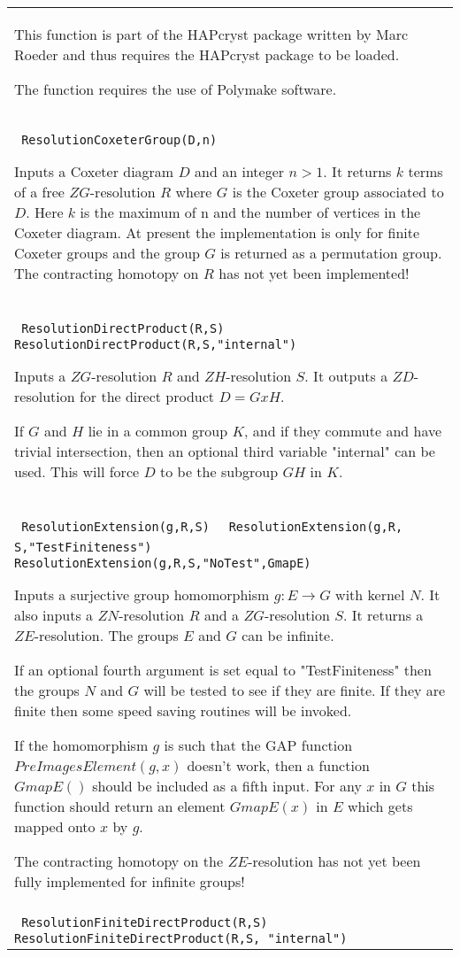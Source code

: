\documentclass[a4paper,11pt]{report}
\begin{document}
{\begin{center}
\begin{tabular}{|l|}
 This function is part of the HAPcryst package written by Marc Roeder and thus
requires the HAPcryst package to be loaded. 

 The function requires the use of Polymake software. \\
 \index{ResolutionCoxeterGroup} \texttt{ ResolutionCoxeterGroup(D,n)} 

 Inputs a Coxeter diagram $D$ and an integer $n>1$. It returns $k$ terms of a free $ZG$-resolution $R$ where $G$ is the Coxeter group associated to $D$. Here $k$ is the maximum of n and the number of vertices in the Coxeter diagram. At
present the implementation is only for finite Coxeter groups and the group $G$ is returned as a permutation group. The contracting homotopy on $R$ has not yet been implemented! \\
 \index{ResolutionDirectProduct} \texttt{ ResolutionDirectProduct(R,S) } {\nobreakspace} \texttt{ ResolutionDirectProduct(R,S,"internal")} 

 Inputs a $ZG$-resolution $R$ and $ZH$-resolution $S$. It outputs a $ZD$-resolution for the direct product $D=G x H$.

 If $G$ and $H$ lie in a common group $K$, and if they commute and have trivial intersection, then an optional third
variable "internal" can be used. This will force $D$ to be the subgroup $GH$ in $K$. \\
 \index{ResolutionExtension} \texttt{ ResolutionExtension(g,R,S) } {\nobreakspace} \texttt{ ResolutionExtension(g,R, S,"TestFiniteness")} {\nobreakspace} \texttt{ ResolutionExtension(g,R,S,"NoTest",GmapE)} 

 Inputs a surjective group homomorphism $g:E \longrightarrow G$ with kernel $N$. It also inputs a $ZN$-resolution $R$ and a $ZG$-resolution $S$. It returns a $ZE$-resolution. The groups $E$ and $G$ can be infinite.

 If an optional fourth argument is set equal to "TestFiniteness" then the
groups $N$ and $G$ will be tested to see if they are finite. If they are finite then some speed
saving routines will be invoked.

 If the homomorphism $g$ is such that the GAP function $PreImagesElement(g,x)$ doesn't work, then a function $GmapE()$ should be included as a fifth input. For any $x$ in $G$ this function should return an element $GmapE(x)$ in $E$ which gets mapped onto $x$ by $g$.

 The contracting homotopy on the $ZE$-resolution has not yet been fully implemented for infinite groups! \\
 \index{ResolutionFiniteDirectProduct} \texttt{ ResolutionFiniteDirectProduct(R,S) } {\nobreakspace} \texttt{ ResolutionFiniteDirectProduct(R,S, "internal")} 


\end{tabular}
\end{center}}
\end{document}

